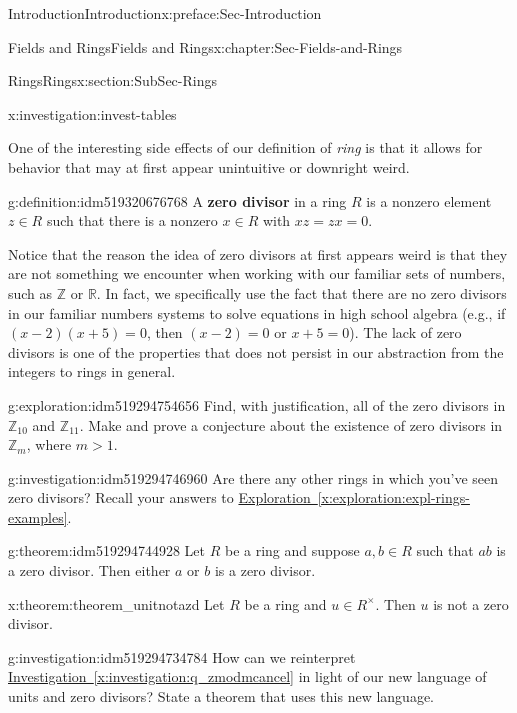 \documentclass[oneside,10pt,]{book}
\newcommand{\xreffont}{\relax}
\newcommand{\terminology}[1]{\textbf{#1}}
\numberwithin{equation}{section}
\def\Z{{\mathbb Z}}
\def\R{{\mathbb R}}
\begin{document}
\begin{preface}{Introduction}{}{Introduction}{}{}{x:preface:Sec-Introduction}
\begin{chapterptx}{Fields and Rings}{}{Fields and Rings}{}{}{x:chapter:Sec-Fields-and-Rings}
\begin{sectionptx}{Rings}{}{Rings}{}{}{x:section:SubSec-Rings}
\begin{investigation}{}{x:investigation:invest-tables}
\end{investigation}
One of the interesting side effects of our definition of \emph{ring} is that it allows for behavior that may at first appear unintuitive or downright weird.%
\begin{definition}{}{g:definition:idm519320676768}%
%
A \terminology{zero divisor} in a ring \(R\) is a nonzero element \(z\in R\) such that there is a nonzero \(x\in R\) with \(xz = zx = 0\).%
\end{definition}
Notice that the reason the idea of zero divisors at first appears weird is that they are not something we encounter when working with our familiar sets of numbers, such as \(\Z\) or \(\R\). In fact, we specifically use the fact that there are no zero divisors in our familiar numbers systems to solve equations in high school algebra (e.g., if \((x-2)(x+5)=0\), then \((x-2)=0\) or \(x+5=0\)). The lack of zero divisors is one of the properties that does not persist in our abstraction from the integers to rings in general.%
\begin{exploration}{}{g:exploration:idm519294754656}%
Find, with justification, all of the zero divisors in \(\Z_{10}\) and \(\Z_{11}\). Make and prove a conjecture about the existence of zero divisors in \(\Z_m\), where \(m > 1\).%
\end{exploration}
\begin{investigation}{}{g:investigation:idm519294746960}%
Are there any other rings in which you've seen zero divisors? Recall your answers to \hyperref[x:exploration:expl-rings-examples]{Exploration~{\xreffont\ref{x:exploration:expl-rings-examples}}}.%
\end{investigation}
\begin{theorem}{}{}{g:theorem:idm519294744928}%
Let \(R\) be a ring and suppose \(a,b\in R\) such that \(ab\) is a zero divisor. Then either \(a\) or \(b\) is a zero divisor.%
\end{theorem}
\begin{theorem}{}{}{x:theorem:theorem_unitnotazd}%
Let \(R\) be a ring and \(u\in R^\times\). Then \(u\) is not a zero divisor.%
\end{theorem}
\begin{investigation}{}{g:investigation:idm519294734784}%
How can we reinterpret \hyperref[x:investigation:q_zmodmcancel]{Investigation~{\xreffont\ref{x:investigation:q_zmodmcancel}}} in light of our new language of units and zero divisors? State a theorem that uses this new language.%
\end{investigation}

\end{sectionptx}
\end{chapterptx}
\end{preface}
\end{document}
